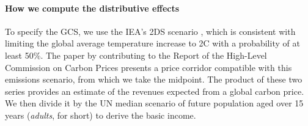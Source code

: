 \documentclass[12pt,english]{article}
\begin{document}
\begin{tcolorbox}
  {\small
  \paragraph{How we compute the distributive effects} %
  To specify the GCS, we use the IEA's 2DS scenario \citep{iea_energy_2017}, which is consistent with limiting the global average temperature increase to 2\textdegree{}C with a probability of at least 50\%. The paper by \citet{hood_input_2017} contributing to the Report of the High-Level Commission on Carbon Prices \citep{stern_report_2017} presents a price corridor compatible with this emissions scenario, from which we take the midpoint. The product of these two series provides an estimate of the revenues expected from a global carbon price. We then divide it by the UN median scenario of future population aged over 15 years (\textit{adults}, for short) to derive the basic income. %
 

}
\end{tcolorbox}
\end{document}
